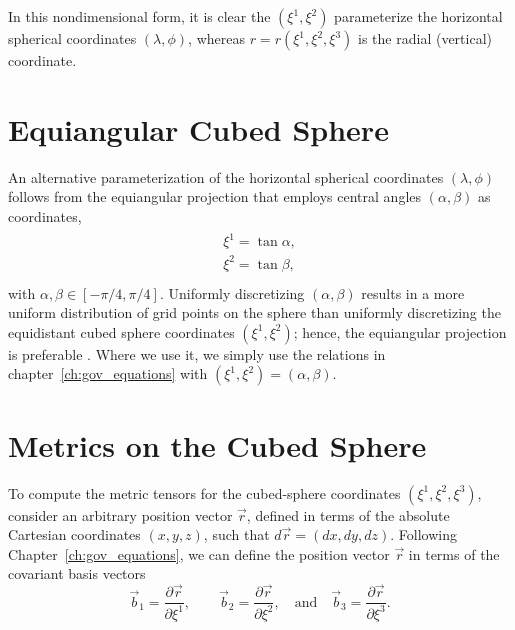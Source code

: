 \documentclass{report}
\begin{document}
In this nondimensional form, it is clear the $(\xi^1, \xi^2)$ parameterize the horizontal spherical coordinates $(\lambda, \phi)$, whereas $r = r(\xi^1, \xi^2, \xi^3)$ is the radial (vertical) coordinate. 

\section{Equiangular Cubed Sphere}

An alternative parameterization of the horizontal spherical coordinates $(\lambda, \phi)$ follows from the equiangular projection that employs central angles $(\alpha, \beta)$ as coordinates,
\begin{align}
    \begin{array}{l}
        \xi^1 = \tan{\alpha}, \\
        \xi^2 = \tan{\beta} , \\
    \end{array}
\end{align}
with $\alpha, \beta \in [- \pi/4, \pi/4]$. Uniformly discretizing $(\alpha, \beta)$ results in a more uniform distribution of grid points on the sphere than uniformly discretizing the equidistant cubed sphere coordinates $(\xi^1, \xi^2)$; hence, the equiangular projection is preferable \citep{Rancic1996, Nair2005}. Where we use it, we simply use the relations in chapter~\ref{ch:gov_equations} with $(\xi^1, \xi^2) = (\alpha, \beta)$.



\section{Metrics on the Cubed Sphere}
\label{sec:metrics-cubed-sphere}
To compute the metric tensors for the cubed-sphere coordinates $(\xi^1, \xi^2, \xi^3)$, consider an arbitrary position vector $\vec{r}$, defined in terms of the absolute Cartesian coordinates $(x,y,z)$, such that $d\vec{r} = (dx, dy, dz)$. Following Chapter~\ref{ch:gov_equations}, we can define the position vector $\vec{r}$ in terms of the covariant basis vectors 
\begin{equation}
    \vec{b}_1 = \frac{\partial \vec{r}}{\partial \xi^1}, \qquad
    \vec{b}_2 = \frac{\partial \vec{r}}{\partial \xi^2}, \quad \text{and} \quad
    \vec{b}_3 = \frac{\partial \vec{r}}{\partial \xi^3}.
\end{equation}
\end{document}
